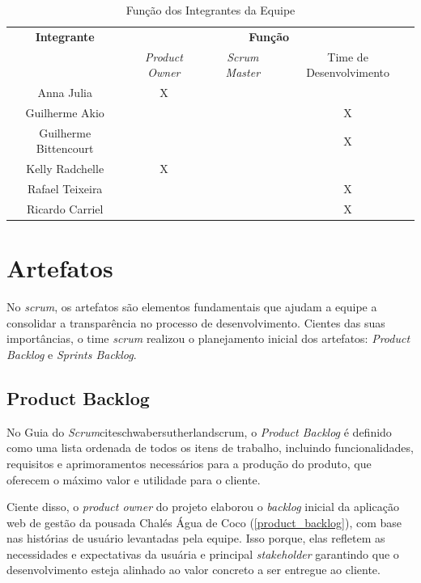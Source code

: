 \documentclass[
	12pt,				%
	openany,			%
	twoside,			%
	a4paper,			%
	english,			%
	french,				%
	spanish,			%
	brazil				%
	]{abntex2}
\begin{document}
\begin{table}[htb]
	\centering
	\caption{Função dos Integrantes da Equipe}
	\label{tab:time_scrum}
	\begin{tabular}{|c|c|c|c|}
		\hline
		\textbf{Integrante} & \multicolumn{3}{c|}{\textbf{Função}} \\ \cline{2-4}
		& \textit{Product Owner} & \textit{Scrum Master} & Time de Desenvolvimento \\ \hline
		Anna Julia & X & & \\ \hline
		Guilherme Akio & & & X \\ \hline
		Guilherme Bittencourt & & & X \\ \hline
		Kelly Radchelle & X & & \\ \hline
		Rafael Teixeira & & & X \\ \hline
		Ricardo Carriel & & & X \\ \hline
	\end{tabular}
\end{table}

\section{Artefatos}
No \textit {scrum},  os artefatos são elementos fundamentais que ajudam a equipe a consolidar a transparência no processo de desenvolvimento. Cientes das suas importâncias, o time \textit {scrum} realizou o planejamento inicial dos artefatos:  \textit {Product Backlog} e \textit {Sprints Backlog}.

\subsection{Product Backlog}
No Guia do \textit{Scrum}citeschwabersutherlandscrum, o \textit {Product Backlog} é definido como uma lista ordenada de todos os itens de trabalho, incluindo funcionalidades, requisitos e aprimoramentos necessários para a produção do produto, que oferecem o máximo valor e utilidade para o cliente.

Ciente disso, o \textit {product owner} do projeto elaborou o \textit {backlog} inicial da aplicação web de gestão da pousada Chalés Água de Coco (\autoref{product_backlog}), com base nas histórias de usuário levantadas pela equipe. Isso porque, elas refletem as necessidades e expectativas da usuária e principal \textit {stakeholder} garantindo que o desenvolvimento esteja alinhado ao valor concreto a ser entregue ao cliente.
\end{document}
